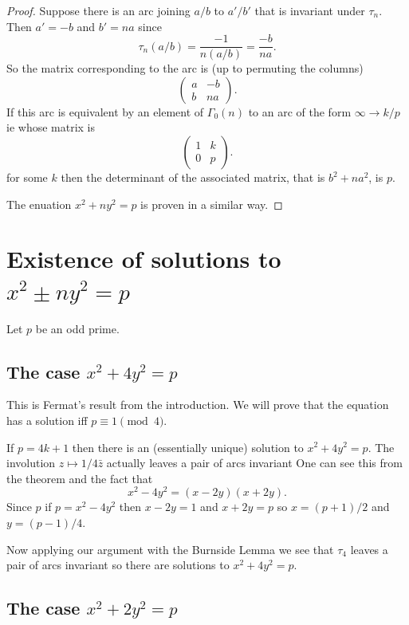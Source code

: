 \documentclass[12pt,a4paper]{amsart}
\begin{document}
\begin{proof}
Suppose there is an arc joining $a/b$ to $a'/b'$ that is invariant under $\tau_n$.
Then $a' = -b$ and $b' = n a$ since 
$$\tau_n(a/b) = \frac{-1}{n(a/b)} = \frac {-b}{na}.$$
So the matrix corresponding to the arc is (up to permuting the columns)
$$\begin{pmatrix} a & -b  \\ b  & n a \end{pmatrix}.$$
If this arc is equivalent  by an element of $\Gamma_0(n)$ to an arc of the form
$\infty \to k/p$ ie  whose matrix is 
$$\begin{pmatrix} 1 & k  \\ 0  & p  \end{pmatrix}.$$
for some $k$ then the determinant of the associated matrix,
that is $b^2 +n a^2$, is $ p$.

The enuation  $x^2 + n y^2 =p$ is proven in a similar way.
\end{proof}


\section{Existence of solutions to $x^2 \pm n y^2 = p$}\label{existence}	

Let $p$ be an odd prime.

\subsection{The case $x^2 + 4 y^2 = p$}\label{case 1}

This is Fermat's result from the introduction.	
We will prove that the equation has a solution iff $p \equiv 1 \pmod{4}$.

If $p = 4k+1$ then there is an (essentially unique) solution to $x^2 + 4 y^2 = p$.
The involution $z \mapsto 1/4 \bar{z}$ actually leaves a pair of arcs invariant 
One can  see this  from the theorem
and the fact that
$$x^2 - 4 y^2  = (x -2y)(x+2y).$$
Since $p$  if $p = x^2 - 4y^2$ then
$x-2y = 1$ and $x+2y = p$ so $x = (p+1)/2$ and $y = (p-1)/4$.

Now applying our argument with the Burnside Lemma we see that $\tau_4$ leaves a pair of arcs invariant so there are  solutions to $x^2 + 4 y^2 = p$.



\subsection{The case $x^2 + 2 y^2 = p$}\label{case 1}
\end{document}
